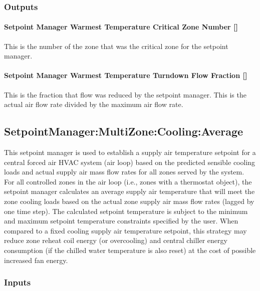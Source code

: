 \subsubsection{Outputs}\label{outputs-032}

\paragraph{Setpoint Manager Warmest Temperature Critical Zone Number {[]}}\label{setpoint-manager-warmest-temperature-critical-zone-number}

This is the number of the zone that was the critical zone for the setpoint manager.

\paragraph{Setpoint Manager Warmest Temperature Turndown Flow Fraction {[]}}\label{setpoint-manager-warmest-temperature-turndown-flow-fraction}

This is the fraction that flow was reduced by the setpoint manager. This is the actual air flow rate divided by the maximum air flow rate.

\subsection{SetpointManager:MultiZone:Cooling:Average}\label{setpointmanagermultizonecoolingaverage}

This setpoint manager is used to establish a supply air temperature setpoint for a central forced air HVAC system (air loop) based on the predicted sensible cooling loads and actual supply air mass flow rates for all zones served by the system. For all controlled zones in the air loop (i.e., zones with a thermostat object), the setpoint manager calculates an average supply air temperature that will meet the zone cooling loads based on the actual zone supply air mass flow rates (lagged by one time step). The calculated setpoint temperature is subject to the minimum and maximum setpoint temperature constraints specified by the user. When compared to a fixed cooling supply air temperature setpoint, this strategy may reduce zone reheat coil energy (or overcooling) and central chiller energy consumption (if the chilled water temperature is also reset) at the cost of possible increased fan energy.

\subsubsection{Inputs}\label{inputs-14-013}

